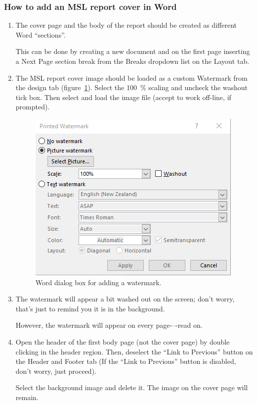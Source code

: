 \subsubsection{How to add an MSL report cover in Word}
\begin{enumerate}
\item	The cover page and the body of the report should be created as different Word ``sections''. 

This can be done by creating a new document and on the first page inserting a Next Page section break from the Breaks dropdown list on the Layout tab.
\item 	The MSL report cover image should be loaded as a custom Watermark from the design tab (figure~\ref{fig:word_watermark_dialog}). Select the \SI{100}{\%} scaling and uncheck the washout tick box. Then select and load the image file (accept to work off-line, if prompted).

\begin{figure}[h]
\centering
\includegraphics[scale=1]{pictures/word_watermark_dialog}
\caption{Word dialog box for adding a watermark.}
\label{fig:word_watermark_dialog}
\end{figure}
\item	The watermark will appear a bit washed out on the screen; don't worry, that's just to remind you it is in the background. 

However, the watermark will appear on every page-–-read on. 
\item Open the header of the first body page (not the cover page) by double clicking in the header region. Then, deselect the ``Link to Previous'' button on the Header and Footer tab (If the ``Link to Previous'' button is disabled, don't worry, just proceed). 

Select the background image and delete it. The image on the cover page will remain. 

\end{enumerate}

